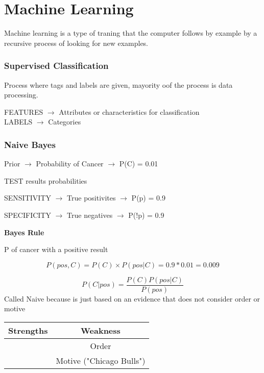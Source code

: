 \documentclass{article}
\newcommand{\ra}{ $\longrightarrow$ }
\begin{document}
\section{Machine Learning} %
\label{sec:Machine Learning}
Machine learning is a type of traning that the computer follows by example by a
recursive process of looking for new examples.
\subsubsection{Supervised Classification } %
\label{ssub:Supervised Classification }
Process where tags and labels are given, mayority oof the process is data
processing.

FEATURES $\longrightarrow$ Attributes or characteristics for classification\\
LABELS $\longrightarrow$ Categories

\subsubsection{Naive Bayes}


Prior \ra Probability of Cancer $\longrightarrow$ P(C) = 0.01 

TEST results probabilities  

SENSITIVITY \ra True positivites \ra P(p) = 0.9

SPECIFICITY \ra True negatives \ra P(!p) = 0.9

\vspace{1cm}
\textbf{Bayes Rule}

P of cancer with a positive result

$$P(pos,C) = P(C) \times P(pos|C) = 0.9*0.01 =0.009$$

$$P(C|pos) = \frac{P(C)P(pos|C)}{P(pos)}$$
Called Naive because is just based on an evidence that does
not consider order or motive
\begin{table}[h]
\begin{center}
  \begin{tabular}{c|c}
    Strengths & Weakness \\
            \hline
            & Order\\
            & Motive ("Chicago Bulls")

  \end{tabular}
\end{center}
\end{table}
\end{document}

